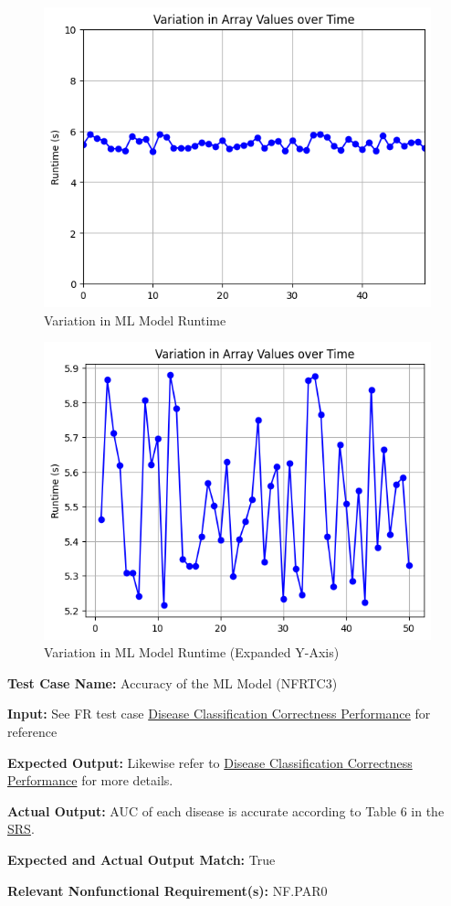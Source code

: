 \documentclass[12pt, titlepage]{article}
\begin{document}
\begin{mdframed}[linewidth=0.5mm]
  \begin{figure}[H]
      \centering
      \includegraphics[width=0.75\linewidth]{output1.png}
      \caption{Variation in ML Model Runtime}
      \label{fig:enter-label}
  \end{figure}
  \begin{figure}[H]
      \centering
      \includegraphics[width=0.75\linewidth]{output2.png}
      \caption{Variation in ML Model Runtime (Expanded Y-Axis)}
      \label{fig:enter-label}
  \end{figure}
\end{mdframed}

\begin{mdframed}[linewidth=0.5mm]
  \textbf{Test Case Name:} Accuracy of the ML Model (NFRTC3) \par
  \textbf{Input:} See FR test case \hyperlink{disClasCorPerf}{Disease Classification Correctness Performance} for reference \par
  \textbf{Expected Output:} Likewise refer to \hyperlink{disClasCorPerf}{Disease Classification Correctness Performance} for more details. \par
  \textbf{Actual Output:} AUC of each disease is accurate according to Table 6 in the \href{https://github.com/tusharagg1/chest-x-ray-ai/blob/main/docs/SRS/SRS.pdf}{SRS}. \par
  \textbf{Expected and Actual Output Match:} True \par
  \textbf{Relevant Nonfunctional Requirement(s):} NF.PAR0
\end{mdframed}
\end{document}
